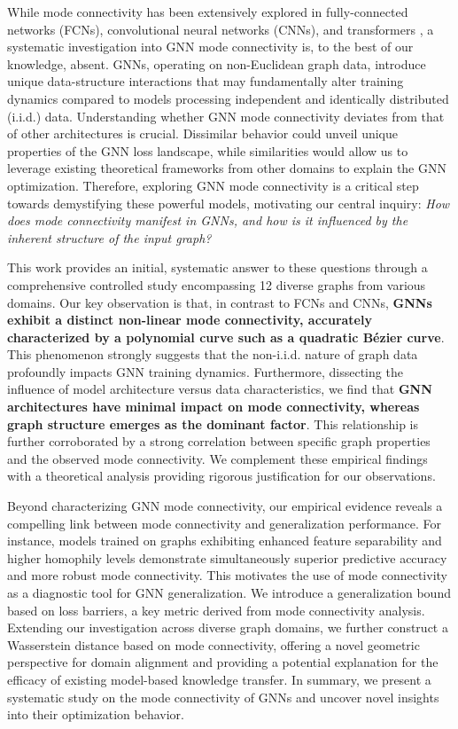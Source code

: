 While mode connectivity has been extensively explored in fully-connected networks (FCNs), convolutional neural networks (CNNs), and transformers \citep{garipov2018loss, draxler2018essentially, qin2022exploring, entezari2021role}, a systematic investigation into GNN mode connectivity is, to the best of our knowledge, absent.  GNNs, operating on non-Euclidean graph data, introduce unique data-structure interactions that may fundamentally alter training dynamics compared to models processing independent and identically distributed (i.i.d.) data. Understanding whether GNN mode connectivity deviates from that of other architectures is crucial. Dissimilar behavior could unveil unique properties of the GNN loss landscape, while similarities would allow us to leverage existing theoretical frameworks from other domains to explain the GNN optimization.  Therefore, exploring GNN mode connectivity is a critical step towards demystifying these powerful models, motivating our central inquiry: \textit{How does mode connectivity manifest in GNNs, and how is it influenced by the inherent structure of the input graph?}

This work provides an initial, systematic answer to these questions through a comprehensive controlled study encompassing 12 diverse graphs from various domains.  Our key observation is that, in contrast to FCNs and CNNs, \textbf{GNNs exhibit a distinct non-linear mode connectivity, accurately characterized by a polynomial curve such as a quadratic Bézier curve}. This phenomenon strongly suggests that the non-i.i.d. nature of graph data profoundly impacts GNN training dynamics.  Furthermore, dissecting the influence of model architecture versus data characteristics, we find that \textbf{GNN architectures have minimal impact on mode connectivity, whereas graph structure emerges as the dominant factor}. This relationship is further corroborated by a strong correlation between specific graph properties and the observed mode connectivity. We complement these empirical findings with a theoretical analysis providing rigorous justification for our observations.

Beyond characterizing GNN mode connectivity, our empirical evidence reveals a compelling link between mode connectivity and generalization performance. For instance, models trained on graphs exhibiting enhanced feature separability and higher homophily levels demonstrate simultaneously superior predictive accuracy and more robust mode connectivity.  This motivates the use of mode connectivity as a diagnostic tool for GNN generalization.  We introduce a generalization bound based on loss barriers, a key metric derived from mode connectivity analysis. Extending our investigation across diverse graph domains, we further construct a Wasserstein distance based on mode connectivity, offering a novel geometric perspective for domain alignment and providing a potential explanation for the efficacy of existing model-based knowledge transfer. In summary, we present a systematic study on the mode connectivity of GNNs and uncover novel insights into their optimization behavior.

